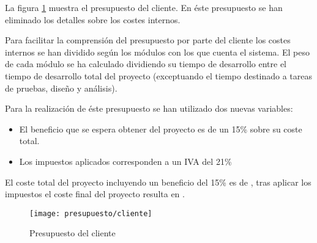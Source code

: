 La figura \ref{fig:presupuesto_cliente} muestra el presupuesto del cliente.  En éste presupuesto se han eliminado los detalles sobre los costes internos.

Para facilitar la comprensión del presupuesto por parte del cliente los costes internos se han dividido según los módulos con los que cuenta el sistema.  El peso de cada módulo se ha calculado dividiendo su tiempo de desarrollo entre el tiempo de desarrollo total del proyecto (exceptuando el tiempo destinado a tareas de pruebas, diseño y análisis).

Para la realización de éste presupuesto se han utilizado dos nuevas variables:
\begin{itemize}
	\item El beneficio que se espera obtener del proyecto es de un 15\% sobre su coste total.
	\item Los impuestos aplicados corresponden a un IVA del 21\%
\end{itemize}

El coste total del proyecto incluyendo un beneficio del 15\% es de , tras aplicar los impuestos el coste final del proyecto resulta en .

\begin{figure}[h]
	\centering
	\texttt{[image: presupuesto/cliente]}
	\caption{Presupuesto del cliente}
	\label{fig:presupuesto_cliente}
\end{figure}

